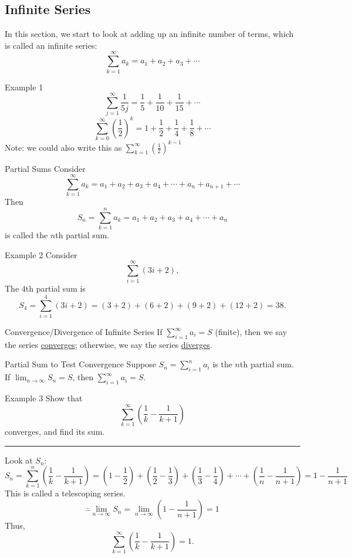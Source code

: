\documentclass[12pt,a4paper]{article}
\begin{document}
\subsection{Infinite Series}
In this section, we start to look at adding up an infinite number of terms, which is called an infinite series: $$\sum_{k=1}^\infty a_k=a_1+a_2+a_3+\cdots$$
\begin{eg}{Example 1}
	$$\sum^\infty_{j=1}\frac{1}{5j}=\frac{1}{5}+\frac{1}{10}+\frac{1}{15}+\cdots$$
	$$\sum_{k=0}^\infty\left(\frac{1}{2}\right)^k=1+\frac{1}{2}+\frac{1}{4}+\frac{1}{8}+\cdots$$
	Note: we could also write this as $\displaystyle\sum_{k=1}^\infty\left(\frac{1}{2}\right)^{k-1}$
\end{eg}
\begin{df}{Partial Sums}
	Consider $$\sum^\infty_{k=1}a_k=a_1+a_2+a_3+a_4+\cdots+a_n+a_{n+1}+\cdots$$
	Then $$S_n=\sum^n_{k=1}a_k=a_1+a_2+a_3+a_4+\cdots+a_n$$ is called the $n$th partial sum. 
\end{df}
\begin{eg}{Example 2}
	Consider $$\sum^\infty_{i=1}(3i+2),$$
	The $4$th partial sum is $$S_4=\sum^4_{i=1}(3i+2)=(3+2)+(6+2)+(9+2)+(12+2)=38.$$
\end{eg}
\begin{df}{Convergence/Divergence of Infinite Series}
	If $\displaystyle\sum^\infty_{i=1}a_i=S$ (finite), then we say the series \underline{converges}; otherwise, we say the series \underline{diverges}.
\end{df}
\begin{thm}{Partial Sum to Test Convergence}
	Suppose $\displaystyle S_n=\sum^n_{i=1}a_i$ is the $n$th partial sum.\\
	If $\displaystyle\lim_{n\to\infty}S_n=S$, then $\displaystyle\sum^\infty_{i=1}a_i=S.$	
\end{thm}
\begin{eg}{Example 3}
	Show that $$\sum^\infty_{k=1}\left(\frac{1}{k}-\frac{1}{k+1}\right)$$ converges, and find its sum.\\
	\noindent\rule[0.25\baselineskip]{\textwidth}{1pt}
	Look at $S_n$: $$S_n=\sum^n_{k=1}\left(\frac{1}{k}-\frac{1}{k+1}\right)=(1-\frac{1}{2})+(\frac{1}{2}-\frac{1}{3})+(\frac{1}{3}-\frac{1}{4})+\cdots+(\frac{1}{n}-\frac{1}{n+1})=1-\frac{1}{n+1}$$
	This is called a telescoping series.
	$$\therefore\lim_{n\to\infty}S_n=\lim_{n\to\infty}\left(1-\frac{1}{n+1}\right)=1$$
	Thus, $$\sum^\infty_{k=1}\left(\frac{1}{k}-\frac{1}{k+1}\right)=1.$$
\end{eg}
\end{document}
